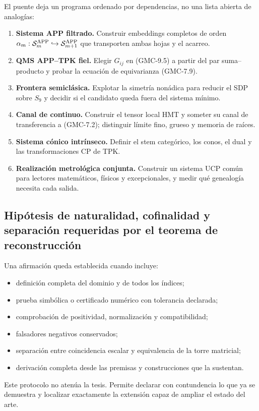 El puente deja un programa ordenado por dependencias, no una lista abierta de
analogías:

\begin{enumerate}
 \item \textbf{Sistema APP filtrado.} Construir embeddings completos de
 orden
 $\alpha_m:\mathcal S_m^{\rm APP}\hookrightarrow
 \mathcal S_{m+1}^{\rm APP}$ que transporten ambas hojas y el acarreo.
 \item \textbf{QMS APP--TPK fiel.} Elegir $G_{ij}$ en
 \textup{(GMC-9.5)} a partir del par suma--producto y probar la ecuación de
 equivarianza \textup{(GMC-7.9)}.
 \item \textbf{Frontera semiclásica.} Explotar la simetría nonádica para
 reducir el SDP sobre $S_9$ y decidir si el candidato queda fuera del sistema
 mínimo.
 \item \textbf{Canal de continuo.} Construir el tensor local HMT y someter
 su canal de transferencia a \textup{(GMC-7.2)}; distinguir límite fino,
 grueso y memoria de
 raíces.
 \item \textbf{Sistema cónico intrínseco.} Definir el stem categórico, los
 conos, el dual y las transformaciones CP de TPK.
 \item \textbf{Realización metrológica conjunta.} Construir un sistema UCP
 común para lectores matemáticos, físicos y excepcionales, y medir qué
 genealogía necesita cada salida.
\end{enumerate}

\subsection{Hipótesis de naturalidad, cofinalidad y separación requeridas por el teorema de reconstrucción}

Una afirmación queda establecida cuando incluye:

\begin{itemize}
 \item definición completa del dominio y de todos los índices;
 \item prueba simbólica o certificado numérico con tolerancia declarada;
 \item comprobación de positividad, normalización y compatibilidad;
 \item falsadores negativos conservados;
 \item separación entre coincidencia escalar y equivalencia de la torre
 matricial;
 \item derivación completa desde las premisas y construcciones que la sustentan.
\end{itemize}

Este protocolo no atenúa la tesis. Permite declarar con contundencia lo que
ya se demuestra y localizar exactamente la extensión capaz de ampliar
el estado del arte.
